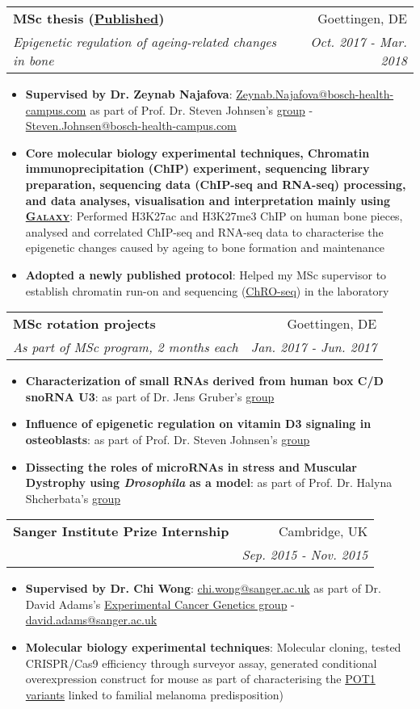 \documentclass[legalpaper,11pt]{article}
\makeatletter
\newcommand{\resumeItem}[2]{
  \item\small{
    \textbf{#1}{: #2 \vspace{-2pt}}
  }
}
\newcommand{\resumeSubheading}[4]{
  \vspace{-1pt}\item
    \begin{tabular*}{0.97\textwidth}[t]{l@{\extracolsep{\fill}}r}
      \textbf{#1} & #2 \\
      \textit{\small#3} & \textit{\small #4} \\
    \end{tabular*}\vspace{-5pt}
}
\newcommand{\resumeItemListStart}{\begin{itemize}}
\newcommand{\resumeItemListEnd}{\end{itemize}\vspace{-5pt}}
\makeatother
\begin{document}
     \resumeSubheading
      {MSc thesis (\href{https://doi.org/10.1038/s41418-020-00614-w}{Published})}{Goettingen, DE}
      {Epigenetic regulation of ageing-related changes in bone}{Oct. 2017 - Mar. 2018}
      \resumeItemListStart
        \resumeItem{Supervised by Dr. Zeynab Najafova}{\href{mailto: Zeynab.Najafova@bosch-health-campus.com}{Zeynab.Najafova@bosch-health-campus.com} as part of Prof. Dr. Steven Johnsen's \href{https://johnsenlab.wordpress.com/}{group} - \href{mailto:Steven.Johnsen@bosch-health-campus.com}{Steven.Johnsen@bosch-health-campus.com}}
        \resumeItem{Core molecular biology experimental techniques, Chromatin immunoprecipitation (ChIP) experiment, sequencing library preparation, sequencing data (ChIP-seq and RNA-seq) processing, and data analyses, visualisation and interpretation mainly using \href{https://usegalaxy.org/}{\textsc{Galaxy}}}{Performed H3K27ac and H3K27me3 ChIP on human bone pieces, analysed and correlated ChIP-seq and RNA-seq data to characterise the epigenetic changes caused by ageing to bone formation and maintenance}
        \resumeItem{Adopted a newly published protocol}{Helped my MSc supervisor to establish chromatin run-on and sequencing (\href{https://www.nature.com/articles/s41588-018-0244-3#data-availability}{ChRO-seq}) in the laboratory}
     \resumeItemListEnd

     \resumeSubheading
      {MSc rotation projects}{Goettingen, DE}
      {As part of MSc program, 2 months each}{Jan. 2017 - Jun. 2017}
      \resumeItemListStart
        \resumeItem{Characterization of small RNAs derived from human box C/D snoRNA U3}{as part of Dr. Jens Gruber's \href{https://bio-protocol.org/UserHome.aspx?id=1032127}{group}}
        \resumeItem{Influence of epigenetic regulation on vitamin D3 signaling in osteoblasts}{as part of Prof. Dr. Steven Johnsen's \href{https://johnsenlab.wordpress.com/}{group}}
        \resumeItem{Dissecting the roles of microRNAs in stress and Muscular Dystrophy using \textit{Drosophila} as a model}{as part of Prof. Dr. Halyna Shcherbata's \href{https://shcherbatalab.wordpress.com/}{group}}
     \resumeItemListEnd

     \resumeSubheading
      {Sanger Institute Prize Internship}{Cambridge, UK}
      {}{Sep. 2015 - Nov. 2015}
      \resumeItemListStart
        \resumeItem{Supervised by Dr. Chi Wong}{\href{mailto: chi.wong@sanger.ac.uk}{chi.wong@sanger.ac.uk} as part of Dr. David Adams's \href{https://www.sanger.ac.uk/group/adams-group/}{Experimental Cancer Genetics group} - \href{mailto:david.adams@sanger.ac.uk}{david.adams@sanger.ac.uk}}
        \resumeItem{Molecular biology experimental techniques}
          {Molecular cloning, tested CRISPR/Cas9 efficiency through surveyor assay, generated conditional overexpression construct for mouse as part of characterising the \href{https://www.nature.com/articles/ng.2947}{POT1 variants} linked to familial melanoma predisposition)}
     \resumeItemListEnd
     
\end{document}
